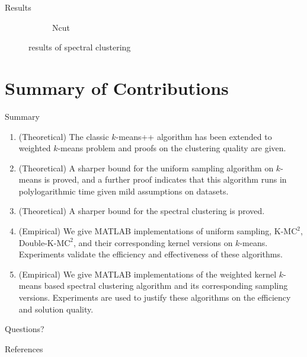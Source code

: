 \documentclass{beamer}
\begin{document}
\begin{frame}{Results}
{\begin{minipage}{1.0\linewidth}
\begin{figure}[H]
\begin{subfigure}{.49\linewidth}
					\caption{Ncut}
				\end{subfigure}
				\caption{results of spectral clustering}
				\label{fig: sp-experiments}
			\end{figure}
		\end{minipage}
	}
	
	
	
\end{frame}

\section{Summary of Contributions}

\begin{frame}{Summary}
	\begin{enumerate}
		\small
		\item (Theoretical) The classic $k$-­means++ algorithm has been extended to weighted $k$-­means problem and proofs on the clustering quality are given.
		\item (Theoretical) A sharper bound for the uniform sampling algorithm on $k$-means is proved, and a further proof indicates that this algorithm runs in polylogarithmic time given mild assumptions on datasets.
		\item (Theoretical) A sharper bound for the spectral clustering is proved.
		\item (Empirical) We give MATLAB implementations of uniform sampling, K-M$\text{C}^2$, Double-K-M$\text{C}^2$, and their corresponding kernel versions on $k$-means. Experiments validate the efficiency and effectiveness of these algorithms.
		\item (Empirical) We give MATLAB implementations of the weighted kernel $k$-means based spectral clustering algorithm and its corresponding sampling versions. Experiments are used to justify these algorithms on the efficiency and solution quality.
	\end{enumerate}
\end{frame}

\begin{frame}[plain,c]
\begin{center}
\Huge Questions?
\end{center}
\end{frame}

\begin{frame}{References}
	\scriptsize
    
    
\end{frame}
\end{document}

